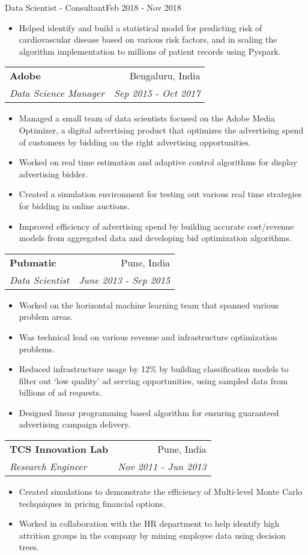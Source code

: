 \documentclass[letterpaper,11pt]{article}
\makeatletter
\newcommand{\resumeSubheading}[4]{
  \vspace{-1pt}\item
    \begin{tabular*}{0.97\textwidth}[t]{l@{\extracolsep{\fill}}r}
      \textbf{#1} & #2 \\
      \textit{\small#3} & \textit{\small #4} \\
    \end{tabular*}\vspace{-5pt}
}
\makeatother
\begin{document}
      {Data Scientist - Consultant}{Feb 2018 - Nov 2018}
\begin{itemize}
\item Helped identify and build a statistical model for
        predicting risk of cardiovascular disease based on various risk factors, and in scaling the algorithm implementation to millions of patient records using Pyspark.
\end{itemize}
\resumeSubheading
	{Adobe}{Bengaluru, India}
	{Data Science Manager}{Sep 2015 - Oct 2017}
\begin{itemize}
	\item Managed a small team of data scientists focused on the Adobe Media Optimizer, a digital advertising product that optimizes the advertising spend of customers by bidding on the right advertising opportunities.
        \item Worked on real time estimation and adaptive control algorithms for display advertising bidder.
        \item Created a simulation environment for testing out various real time strategies for bidding in online auctions.
        \item Improved efficiency of advertising spend  by building accurate cost/revenue models from aggregated data and developing bid optimization algorithms.    
\end{itemize}

\resumeSubheading
	{Pubmatic}{Pune, India}
	{Data Scientist}{June 2013 - Sep 2015}
\begin{itemize}
	\item Worked on the horizontal machine learning team that spanned various problem areas.
       \item Was technical lead on various revenue and infrastructure optimization problems.
        \item Reduced infrastructure usage by 12\% by building classification models to filter out ‘low quality’ ad serving opportunities, using sampled data from billions of ad requests.
        \item Designed linear programming based algorithm for ensuring guaranteed advertising campaign delivery.
\end{itemize}

\resumeSubheading
	{TCS Innovation Lab}{Pune, India}
	{Research Engineer}{Nov 2011 - Jun 2013}
\begin{itemize}
	  \item  Created simulations to demonstrate the efficiency of Multi-level Monte Carlo techqniques in pricing financial options.
	\item Worked in collaboration with the HR department to help identify high attrition groups in the company by mining employee data using decision trees.   
\end{itemize}
\end{document}
